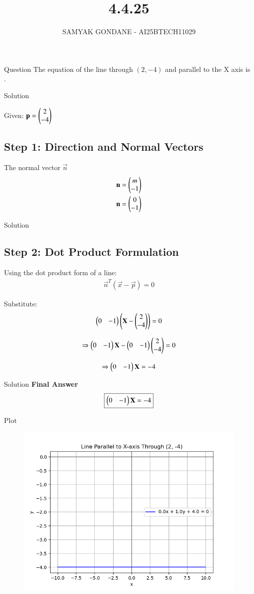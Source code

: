 \documentclass{beamer}
\title 
{4.4.25}
\date{}
\author
{SAMYAK GONDANE - AI25BTECH11029}
\begin{document}
\frame{\titlepage}

\begin{frame}{Question}
The equation of the line through $(2, -4)$ and parallel to the X axis is \underline{\hspace{2 cm}}.
\end{frame}

\begin{frame}{Solution}

Given: $\mathbf{p} = \begin{pmatrix}2 \\ -4\end{pmatrix}$

\subsection*{Step 1: Direction and Normal Vectors}
The normal vector $\vec{n}$
\begin{align}
\mathbf{n} = \begin{pmatrix}m \\ -1\end{pmatrix}\\
\mathbf{n} = \begin{pmatrix}0 \\ -1\end{pmatrix}
\end{align}
\end{frame}

\begin{frame}{Solution}
\subsection*{Step 2: Dot Product Formulation}
Using the dot product form of a line:
\begin{align}
\vec{n}^T (\vec{x} - \vec{p}) = 0
\end{align}

Substitute:
\begin{align}
\begin{pmatrix}0 & -1\end{pmatrix} \begin{pmatrix}\mathbf{X} - \begin{pmatrix}2 \\ -4\end{pmatrix}\end{pmatrix} = 0
\end{align}

\begin{align}
\Rightarrow \begin{pmatrix}0 & -1\end{pmatrix}\mathbf{X} - \begin{pmatrix}0 & -1\end{pmatrix}\begin{pmatrix}2 \\ -4\end{pmatrix} = 0
\end{align}

\begin{align}
\Rightarrow \begin{pmatrix}0 & -1\end{pmatrix}\mathbf{X} = -4
\end{align}
\end{frame}

\begin{frame}{Solution}
\textbf{Final Answer}
\begin{align}
\boxed{\begin{pmatrix}0 & -1\end{pmatrix}\mathbf{X} = -4}
\end{align}
\end{frame}

\begin{frame}{Plot}
    \begin{figure}
        \centering
        \includegraphics[width=0.5\linewidth]{./figs/Figure_1.png}
        \caption{}
        \label{fig:fig1}
    \end{figure}
\end{frame}
\end{document}
